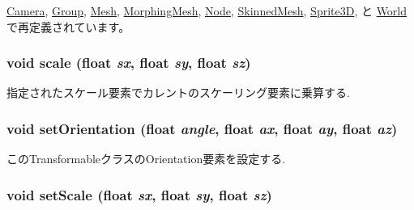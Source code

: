 \hyperlink{classm3g_1_1Camera_1efcb1973989d9963d5bd6d03065d389}{Camera}, \hyperlink{classm3g_1_1Group_1efcb1973989d9963d5bd6d03065d389}{Group}, \hyperlink{classm3g_1_1Mesh_1efcb1973989d9963d5bd6d03065d389}{Mesh}, \hyperlink{classm3g_1_1MorphingMesh_1efcb1973989d9963d5bd6d03065d389}{MorphingMesh}, \hyperlink{classm3g_1_1Node_1efcb1973989d9963d5bd6d03065d389}{Node}, \hyperlink{classm3g_1_1SkinnedMesh_1efcb1973989d9963d5bd6d03065d389}{SkinnedMesh}, \hyperlink{classm3g_1_1Sprite3D_1efcb1973989d9963d5bd6d03065d389}{Sprite3D}, と \hyperlink{classm3g_1_1World_1efcb1973989d9963d5bd6d03065d389}{World}で再定義されています。\hypertarget{classm3g_1_1Transformable_d94deaf828db5e2dfd5e40db42b64cd9}{
\subsubsection[{scale}]{\setlength{\rightskip}{0pt plus 5cm}void scale (float {\em sx}, \/  float {\em sy}, \/  float {\em sz})}}
\label{classm3g_1_1Transformable_d94deaf828db5e2dfd5e40db42b64cd9}


指定されたスケール要素でカレントのスケーリング要素に乗算する. \hypertarget{classm3g_1_1Transformable_980a9a2b5f6102763042e616d3aa4606}{
\subsubsection[{setOrientation}]{\setlength{\rightskip}{0pt plus 5cm}void setOrientation (float {\em angle}, \/  float {\em ax}, \/  float {\em ay}, \/  float {\em az})}}
\label{classm3g_1_1Transformable_980a9a2b5f6102763042e616d3aa4606}


このTransformableクラスのOrientation要素を設定する. \hypertarget{classm3g_1_1Transformable_937d04042c25021532ea2532fe5e3a32}{
\subsubsection[{setScale}]{\setlength{\rightskip}{0pt plus 5cm}void setScale (float {\em sx}, \/  float {\em sy}, \/  float {\em sz})}}
\label{classm3g_1_1Transformable_937d04042c25021532ea2532fe5e3a32}


